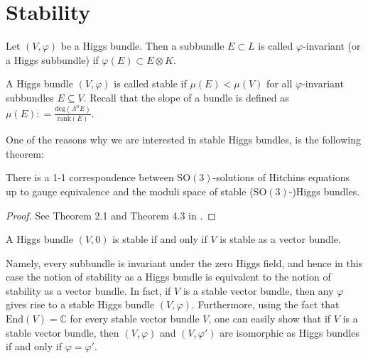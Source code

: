 \section{Stability} %

\begin{definition}
    Let $( V, \varphi) $ be a Higgs bundle. Then a subbundle $ E \subset L$ is called $ \varphi$-invariant (or a Higgs subbundle) if $ \varphi(E) \subset E \otimes K$. 
\end{definition}
\begin{definition}
    A Higgs bundle $( V, \varphi) $ is called stable if $\mu(E) < \mu(V) $ for all $\varphi$-invariant subbundles $E \subseteq V$. 
    Recall that the slope of a bundle is defined as $ \mu(E) : = \frac{\mathrm{deg} ( \Lambda^nE)}{\mathrm{rank}(E)} $.
\end{definition}

One of the reasons why we are interested in stable Higgs bundles, is the following theorem: 
\begin{theorem}
	There is a 1-1 correspondence between $\mathrm{SO}(3)$-solutions of Hitchins equations up to gauge equivalence and the moduli space of stable ($\mathrm{SO}(3)$-)Higgs bundles. 
\end{theorem}

\begin{proof}
	See Theorem 2.1 and Theorem 4.3 in \cite{Hitchin}.
\end{proof}

\begin{example}\label{ex:Vstable}
	A Higgs bundle $(V,0)$ is stable if and only if $ V$ is stable as a vector bundle. 
\end{example}
Namely, every subbundle is invariant under the zero Higgs field, and hence in this case the notion of stability as a Higgs bundle is equivalent to the notion of stability as a vector bundle. In fact, if $ V$ is a stable vector bundle, then any $\varphi$ gives rise to a stable Higgs bundle $(V,\varphi)$. 
Furthermore, using the fact that $\mathrm{End}(V)=\mathbb{C}$ for every stable vector bundle $V$, one can easily show that if $V$ is a stable vector bundle, then $(V, \varphi)$ and $(V, \varphi') $ are isomorphic as Higgs bundles if and only if $ \varphi = \varphi'$. 

